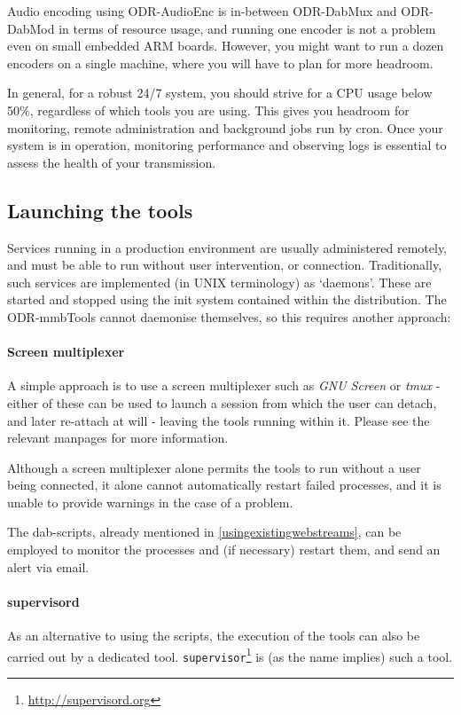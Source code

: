 Audio encoding using ODR-AudioEnc is in-between ODR-DabMux and ODR-DabMod in
terms of resource usage, and running one encoder is not a problem even on small
embedded ARM boards.
However, you might want to run a dozen encoders on a single machine, where you
will have to plan for more headroom.

In general, for a robust 24/7 system, you should strive for a CPU usage below
50\%, regardless of which tools you are using. This gives you headroom for
monitoring, remote administration and background jobs run by cron.
Once your system is in operation, monitoring performance and observing logs is
essential to assess the health of your transmission.


\subsection{Launching the tools}

Services running in a production environment are usually administered remotely,
and must be able to run without user intervention, or connection. Traditionally,
such services are implemented (in UNIX terminology) as `daemons'. These are
started and stopped using the init system contained within the distribution.
The ODR-mmbTools cannot daemonise themselves, so this requires another approach:

\paragraph{Screen multiplexer}
A simple approach is to use a screen multiplexer such as \emph{GNU Screen} or
\emph{tmux} - either of these can be used to launch a session from which the
user can detach, and later re-attach at will - leaving the tools running within
it. Please see the relevant manpages for more information.

Although a screen multiplexer alone permits the tools to run without a user
being connected, it alone cannot automatically restart failed processes, and it
is unable to provide warnings in the case of a problem.

The dab-scripts, already mentioned in \ref{usingexistingwebstreams}, can be
employed to monitor the processes and (if necessary) restart them, and send an
alert via email.

\paragraph{supervisord}
As an alternative to using the scripts, the execution of the tools can also be
carried out by a dedicated tool. \texttt{supervisor}\footnote{\url{http://supervisord.org}}
is (as the name implies) such a tool.


